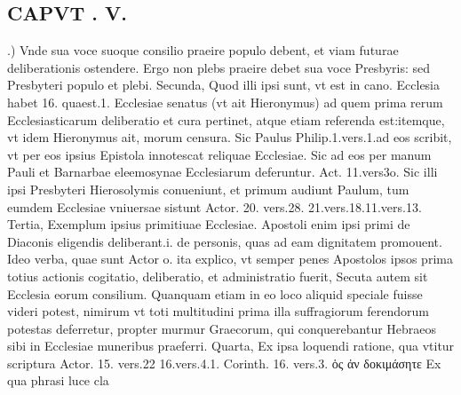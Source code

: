 \documentclass{article}
\begin{document}
\begin{pages}
\section*{CAPVT . V. }
\marginpar{[ p.353 ]}.) Vnde sua voce suoque consilio praeire populo debent, et viam futurae deliberationis ostendere. Ergo non plebs praeire debet sua voce Presbyris: sed Presbyteri populo et plebi. Secunda, Quod illi ipsi sunt, vt est in cano. Ecclesia habet 16. quaest.1. Ecclesiae senatus (vt ait Hieronymus) ad quem prima rerum Ecclesiasticarum deliberatio et cura pertinet, atque etiam referenda est:itemque, vt idem Hieronymus ait, morum censura. Sic Paulus Philip.1.vers.1.ad eos scribit, vt per eos ipsius Epistola innotescat reliquae Ecclesiae. Sic ad eos per manum Pauli et Barnarbae eleemosynae Ecclesiarum deferuntur. Act. 11.vers3o. Sic illi ipsi Presbyteri Hierosolymis conueniunt, et primum audiunt Paulum, tum eumdem Ecclesiae vniuersae sistunt Actor. 20. vers.28. 21.vers.18.11.vers.13. Tertia, Exemplum ipsius primitiuae Ecclesiae. Apostoli enim ipsi primi de Diaconis eligendis deliberant.i. de personis, quas ad eam dignitatem promouent. Ideo verba, quae sunt Actor o. ita explico, vt semper penes Apostolos ipsos prima totius actionis cogitatio, deliberatio, et administratio fuerit, Secuta autem sit Ecclesia eorum consilium. Quanquam etiam in eo loco aliquid speciale fuisse videri potest, nimirum vt toti multitudini prima illa suffragiorum ferendorum potestas deferretur, propter murmur Graecorum, qui conquerebantur Hebraeos sibi in Ecclesiae muneribus praeferri. Quarta, Ex ipsa loquendi ratione, qua vtitur scriptura Actor. 15. vers.22 16.vers.4.1. Corinth. 16. vers.3. ὁς ἀν δοκιμάσητε Ex qua phrasi luce cla\pend

\end{pages}
\end{document}
